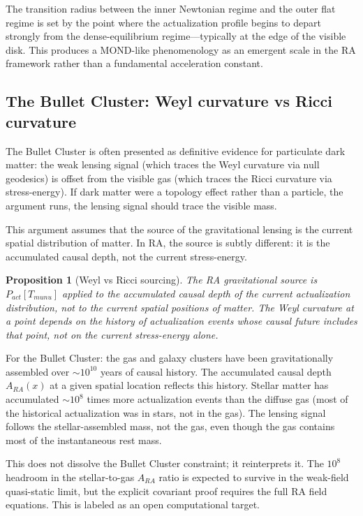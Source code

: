 \documentclass[11pt]{article}
\def\mu{mu}%
\def\nu{nu}%
\def\mathrm#1{#1}%
\newtheorem{proposition}{Proposition}
\begin{document}
The transition radius between the inner Newtonian regime and the outer flat regime is set by the point where the actualization profile begins to depart strongly from the dense-equilibrium regime---typically at the edge of the visible disk. This produces a MOND-like phenomenology as an emergent scale in the RA framework rather than a fundamental acceleration constant.

\subsection{The Bullet Cluster: Weyl curvature vs Ricci curvature}
\label{sec:bullet_cluster}

The Bullet Cluster is often presented as definitive evidence for particulate dark matter: the weak lensing signal (which traces the Weyl curvature via null geodesics) is offset from the visible gas (which traces the Ricci curvature via stress-energy). If dark matter were a topology effect rather than a particle, the argument runs, the lensing signal should trace the visible mass.

This argument assumes that the source of the gravitational lensing is the current spatial distribution of matter. In RA, the source is subtly different: it is the accumulated causal depth, not the current stress-energy.

\begin{proposition}[Weyl vs Ricci sourcing]
\label{prop:weyl_ricci}
The RA gravitational source is $P_{\mathrm{act}}[T_{\mu\nu}]$ applied to the accumulated causal depth of the current actualization distribution, not to the current spatial positions of matter. The Weyl curvature at a point depends on the history of actualization events whose causal future includes that point, not on the current stress-energy alone.
\end{proposition}

For the Bullet Cluster: the gas and galaxy clusters have been gravitationally assembled over $\sim 10^{10}$ years of causal history. The accumulated causal depth $A_{\mathrm{RA}}(x)$ at a given spatial location reflects this history. Stellar matter has accumulated $\sim 10^8$ times more actualization events than the diffuse gas (most of the historical actualization was in stars, not in the gas). The lensing signal follows the stellar-assembled mass, not the gas, even though the gas contains most of the instantaneous rest mass.

This does not dissolve the Bullet Cluster constraint; it reinterprets it. The $10^8$ headroom in the stellar-to-gas $A_{\mathrm{RA}}$ ratio is expected to survive in the weak-field quasi-static limit, but the explicit covariant proof requires the full RA field equations. This is labeled as an open computational target.
\end{document}
